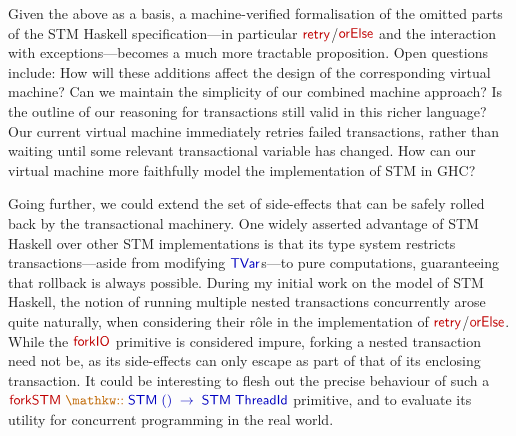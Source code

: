 Given the above as a basis, a machine-verified formalisation of the omitted
parts of the STM Haskell specification---in particular
$\func{retry}$/$\func{orElse}$ and the interaction with exceptions---becomes
a much more tractable proposition. Open questions include: How will these
additions affect the design of the corresponding virtual machine? Can we
maintain the simplicity of our combined machine approach? Is the outline of
our reasoning for transactions still valid in this richer language? Our
current virtual machine immediately retries failed transactions, rather than
waiting until some relevant transactional variable has changed. How can our
virtual machine more faithfully model the implementation of STM in GHC?

Going further, we could extend the set of side-effects that can be safely
rolled back by the transactional machinery. One widely asserted advantage of
STM Haskell over other STM implementations is that its type system restricts
transactions---aside from modifying $\type{TVar}$s---to pure computations,
guaranteeing that rollback is always possible. During my initial work on the
model of STM Haskell, the notion of running multiple nested transactions
concurrently arose quite naturally, when considering their r\^{o}le in the
implementation of $\func{retry}$/$\func{orElse}$. While the $\func{forkIO}$
primitive is considered impure, forking a nested transaction need not be, as
its side-effects can only escape as part of that of its enclosing
transaction. It could be interesting to flesh out the precise behaviour of
such
a $\func{forkSTM}\;\keyw{::}\;\type{STM\;()\;\rightarrow\;STM\;ThreadId}$
primitive, and to evaluate its utility for concurrent programming in the
real world.





